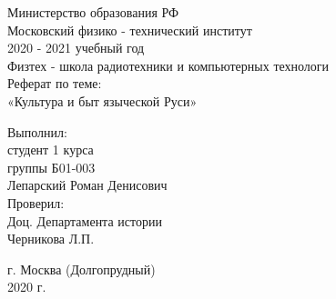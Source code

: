 \documentclass[a4paper, 12pt]{report}
\begin{document}
 
\begin{titlepage}


\begin{center}

\hfill \break
\large{Министерство образования РФ}\\
\large{Московский физико - технический институт}\\
\normalsize{2020 - 2021 учебный год}\\ 
\hfill \break
\hfill \break
\normalsize{Физтех - школа радиотехники и компьютерных технологи}\\
\hfill \break
\hfill \break
\normalsize{Реферат по теме:}\\
\hfill \break
\LARGE{«Культура и быт языческой Руси»}\\

\end{center}

\hfill \break

\vspace*{4cm}
\begin{flushright}
  Выполнил: \\
  студент 1 курса \\
  группы Б01-003 \\
  Лепарский Роман Денисович \\
  \hfill \break
  Проверил: \\
  Доц. Департамента истории \\
  Черникова Л.П. 
\end{flushright}
 
\vspace*{1cm}
\begin{center}
	г. Москва (Долгопрудный) \\
	2020 г.
\end{center}

\thispagestyle{empty} %
 

\restoregeometry

\end{titlepage}
\end{document}
